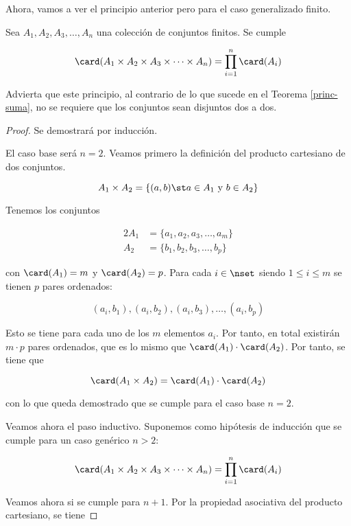 Ahora, vamos a ver el principio anterior pero para el caso generalizado
finito.

\begin{theorem}
  Sea $A_1, A_2, A_3, \ldots, A_n$ una colección de conjuntos finitos. Se
  cumple

  $$ \card(A_1 \times A_2 \times A_3 \times \cdots \times A_n) =
  \prod_{i=1}^n \card(A_i) $$
\end{theorem}

Advierta que este principio, al contrario de lo que sucede en el Teorema
\ref{princ-suma}, no se requiere que los conjuntos sean disjuntos dos a dos.

\begin{proof}
  Se demostrará por inducción.

  El caso base será $n = 2$. Veamos primero la definición del producto
  cartesiano de dos conjuntos.

  $$ A_1 \times A_2 = \{(a, b) \st a \in A_1 \ \text{y} \ b \in A_2\} $$

  Tenemos los conjuntos

  \begin{alignat*}{2}
    A_1 &= \{a_1, a_2, a_3, \ldots, a_m\} \\
    A_2 &= \{b_1, b_2, b_3, \ldots, b_p\}
  \end{alignat*}

  \noindent con $\card(A_1) = m$ y $\card(A_2) = p$. Para cada $i \in \nset$
  siendo $1 \leq i \leq m$ se tienen $p$ pares ordenados:

  $$ (a_i, b_1), (a_i, b_2), (a_i, b_3), \ldots, (a_i, b_p) $$

  Esto se tiene para cada uno de los $m$ elementos $a_i$. Por tanto, en
  total existirán $m \cdot p$ pares ordenados, que es lo mismo que
  $\card(A_1) \cdot \card(A_2)$. Por tanto, se tiene que

  $$ \card(A_1 \times A_2) = \card(A_1) \cdot \card(A_2) $$

  \noindent con lo que queda demostrado que se cumple para el caso base $n =
  2$.

  Veamos ahora el paso inductivo. Suponemos como hipótesis de inducción que
  se cumple para un caso genérico $n > 2$:

  $$ \card(A_1 \times A_2 \times A_3 \times \cdots \times A_n) =
  \prod_{i=1}^n \card(A_i)$$

  Veamos ahora si se cumple para $n+1$. Por la propiedad asociativa del
  producto cartesiano, se tiene


\end{proof}
